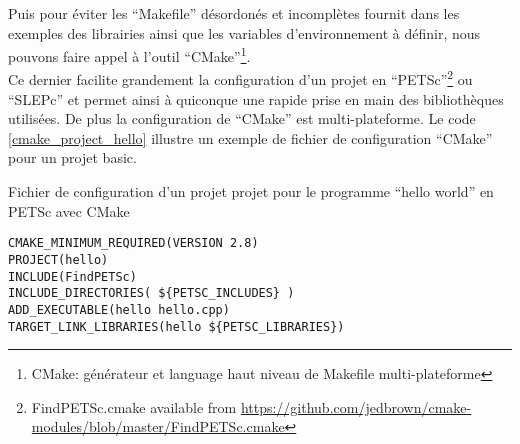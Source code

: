 Puis pour éviter les ``Makefile'' désordonés et incomplètes fournit dans les exemples des librairies ainsi que les variables d'environnement à définir, nous pouvons faire appel à l'outil ``CMake''\footnote{CMake: générateur et language haut niveau de Makefile multi-plateforme}.\\

Ce dernier facilite grandement la configuration d'un projet en ``PETSc''\footnote{FindPETSc.cmake available from \url{https://github.com/jedbrown/cmake-modules/blob/master/FindPETSc.cmake}} ou ``SLEPc'' et permet ainsi à quiconque une rapide prise en main des bibliothèques utilisées. De plus la configuration de ``CMake'' est multi-plateforme. Le code \ref{cmake_project_hello} illustre un exemple de fichier de configuration ``CMake'' pour un projet basic.

\begin{algorithm}[h]
  \caption{Fichier de configuration d'un projet projet pour le programme ``hello world'' en PETSc avec CMake}
  \label{cmake_project_hello}
\begin{verbatim}
CMAKE_MINIMUM_REQUIRED(VERSION 2.8)
PROJECT(hello)
INCLUDE(FindPETSc)
INCLUDE_DIRECTORIES( ${PETSC_INCLUDES} )
ADD_EXECUTABLE(hello hello.cpp)
TARGET_LINK_LIBRARIES(hello ${PETSC_LIBRARIES})
\end{verbatim}
\end{algorithm}
